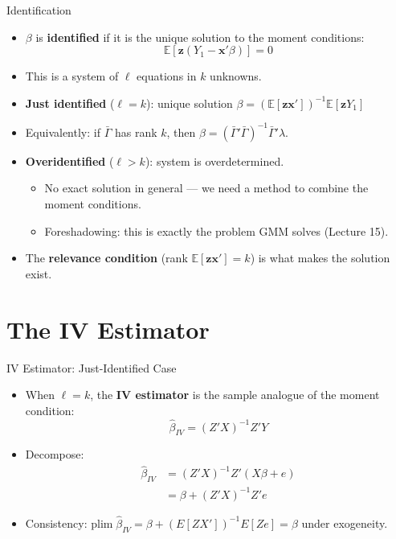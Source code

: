 \documentclass[aspectratio=169, handout]{beamer}
\numberwithin{equation}{section}
\begin{document}
\begin{frame}{Identification}
\begin{itemize}
\item $\beta$ is \textbf{identified} if it is the unique solution to the moment conditions:
$$\mathbb{E}[\bm{z}(Y_1-\bm{x}'\beta)]=0$$
\item This is a system of $\ell$ equations in $k$ unknowns.
\item \textbf{Just identified} ($\ell=k$): unique solution $\beta = (\mathbb{E}[\bm{z}\bm{x}'])^{-1}\mathbb{E}[\bm{z}Y_1]$
\item Equivalently: if $\bar{\Gamma}$ has rank $k$, then $\beta=(\bar{\Gamma}'\bar{\Gamma})^{-1}\bar{\Gamma}'\lambda$.
\item \textbf{Overidentified} ($\ell>k$): system is overdetermined.
\begin{itemize}
\item No exact solution in general --- we need a method to combine the moment conditions.
\item \alert{Foreshadowing:} this is exactly the problem GMM solves (Lecture 15).
\end{itemize}
\item The \textbf{relevance condition} (rank $\mathbb{E}[\bm{z}\bm{x}']=k$) is what makes the solution exist.
\end{itemize}
\end{frame}


\section{The IV Estimator}

\begin{frame}{IV Estimator: Just-Identified Case}
\begin{itemize}
\item When $\ell=k$, the \textbf{IV estimator} is the sample analogue of the moment condition:
$$\hat{\beta}_{IV} = (Z'X)^{-1}Z'Y$$
\item Decompose:
\begin{align*}
\hat{\beta}_{IV} &= (Z'X)^{-1}Z'(X\beta+e)\\
&= \beta + (Z'X)^{-1}Z'e
\end{align*}
\item Consistency: $\text{plim}\;\hat{\beta}_{IV} = \beta + (E[ZX'])^{-1}E[Ze] = \beta$ \quad under exogeneity.
\end{itemize}
\end{frame}
\end{document}
